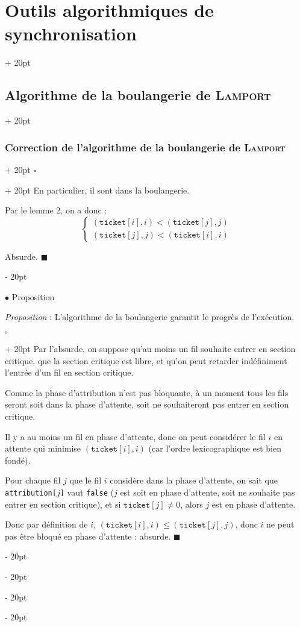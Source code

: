 \documentclass[a4paper, 12pt, twoside]{article}
\renewcommand{\le}{\leqslant}
\newcommand{\ind}[1][20pt]{\advance\leftskip + #1}
\newcommand{\deind}[1][20pt]{\advance\leftskip - #1}
\newenvironment{indt}[2][20pt]{#2 \par \ind[#1]}{\par \deind} %
\newenvironment{proof}[1][{}]{\begin{indt}{$\square$ #1}}{$\blacksquare$ \end{indt}}
\begin{document}
\begin{indt}{\section{Outils algorithmiques de synchronisation}}
\begin{indt}{\subsection{Algorithme de la boulangerie de \textsc{Lamport}}}
\begin{indt}{\subsubsection{Correction de l'algorithme de la boulangerie de \textsc{Lamport}}}
\begin{proof}
                    En particulier, il sont dans la boulangerie.

                    Par le lemme 2, on a donc :
                    \[
                        \begin{cases}
                            (\mathtt{ticket}[i], i) < (\mathtt{ticket}[j], j)
                            \\
                            (\mathtt{ticket}[j], j) < (\mathtt{ticket}[i], i)
                        \end{cases}
                    \]

                    Absurde.
                \end{proof}

                \vspace{12pt}
                
                $\bullet$ Proposition

                \begin{emphBox}
                    \textit{Proposition} :
                    L'algorithme de la boulangerie garantit le progrès de l'exécution.
                \end{emphBox}

                \vspace{12pt}
                
                \begin{proof}
                    Par l'absurde, on suppose qu'au moins un fil souhaite entrer en section critique, que la section critique est libre, et qu'on peut retarder indéfiniment l'entrée d'un fil en section critique.

                    Comme la phase d'attribution n'est pas bloquante, à un moment tous les fils seront soit dans la phase d'attente, soit ne souhaiteront pas entrer en section critique.

                    Il y a au moins un fil en phase d'attente, donc on peut considérer le fil $i$ en attente qui minimise $(\mathtt{ticket}[i], i)$ (car l'ordre lexicographique est bien fondé).

                    Pour chaque fil $j$ que le fil $i$ considère dans la phase d'attente, on sait que \texttt{attribution[$j$]} vaut \texttt{false} ($j$ est soit en phase d'attente, soit ne souhaite pas entrer en section critique), et si $\mathtt{ticket}[j] \neq 0$, alors $j$ est en phase d'attente.

                    Donc par définition de $i$, $(\mathtt{ticket}[i], i) \le (\mathtt{ticket}[j], j)$, donc $i$ ne peut pas être bloqué en phase d'attente : absurde.
                \end{proof}


\end{indt}
\end{indt}
\end{indt}
\end{document}
